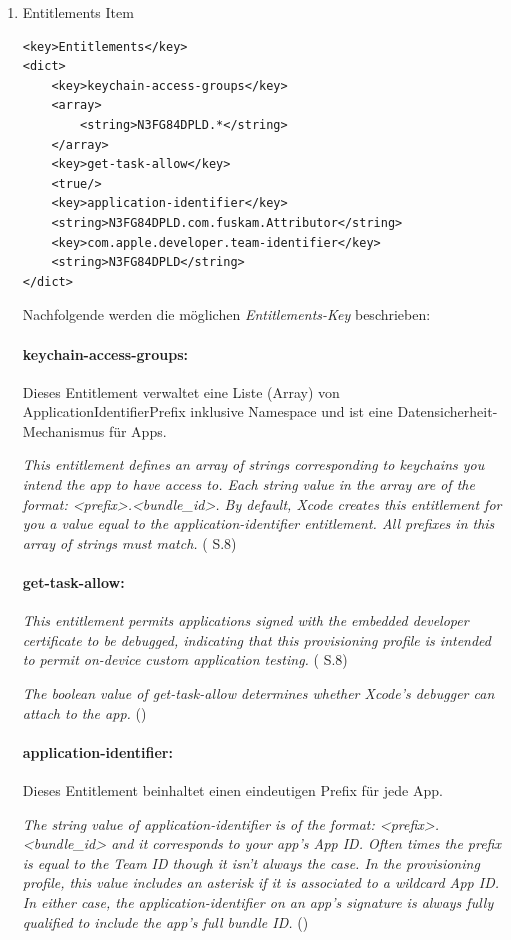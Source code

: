 \begin{enumerate}
    \item Entitlements Item
\begin{lstlisting}[captionpos=b, caption={Entitlements Item}]
<key>Entitlements</key>
<dict>
    <key>keychain-access-groups</key>
    <array>
        <string>N3FG84DPLD.*</string>           
    </array>
    <key>get-task-allow</key>
    <true/>
    <key>application-identifier</key>
    <string>N3FG84DPLD.com.fuskam.Attributor</string>
    <key>com.apple.developer.team-identifier</key>
    <string>N3FG84DPLD</string>
</dict>
\end{lstlisting}

Nachfolgende werden die möglichen \textit{\glqq Entitlements-Key\grqq{}} beschrieben:

\paragraph{keychain-access-groups:}
Dieses Entitlement verwaltet eine Liste (Array) von ApplicationIdentifierPrefix inklusive Namespace und ist eine Datensicherheit-Mechanismus für Apps. \par 
    \glqq \textit{This entitlement defines an array of strings corresponding to keychains you intend the app to have access to. Each string value in the array are of the format: <prefix>.<bundle\_id>. By default, Xcode creates this entitlement for you a value equal to the application-identifier entitlement. All prefixes in this array of strings must match.}\grqq{} (\cite{iOSSec[5]} S.8)

\paragraph{get-task-allow:} 
\glqq\textit{This entitlement permits applications signed with the embedded developer certificate to be debugged, indicating that this provisioning profile is intended to permit on-device custom application testing.}\grqq{} (\cite{iOSSec[5]} S.8) \par 
    \glqq \textit{The boolean value of get-task-allow determines whether Xcode's debugger can attach to the app.}\grqq{} (\cite{ProvisioningProfile[3]})

\paragraph{application-identifier:} Dieses Entitlement beinhaltet einen eindeutigen Prefix für jede App.\par
    \glqq \textit{The string value of application-identifier is of the format: <prefix>.<bundle\_id> and it corresponds to your app's App ID. Often times the prefix is equal to the Team ID though it isn't always the case. In the provisioning profile, this value includes an asterisk if it is associated to a wildcard App ID. In either case, the application-identifier on an app's signature is always fully qualified to include the app's full bundle ID.} \grqq{} (\cite{ProvisioningProfile[3]})


\end{enumerate}
